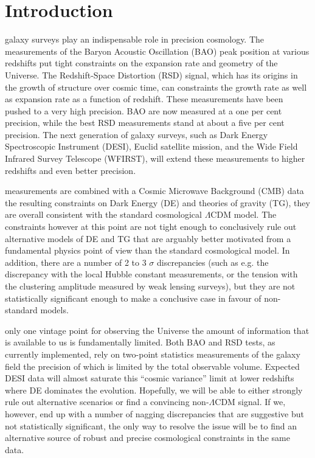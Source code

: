 
\newpage


\section{Introduction} %
galaxy surveys play an indispensable role in precision cosmology.  The
measurements of the Baryon Acoustic Oscillation (BAO) peak position at various
redshifts put tight constraints on the expansion rate and geometry of the
Universe. The Redshift-Space Distortion (RSD) signal, which has its origins in
the growth of structure over cosmic time, can constraints the growth rate as
well as expansion rate as a function of redshift. These measurements have been
pushed to a very high precision. BAO are now measured at a one per cent
precision,  while the best RSD measurements stand at about a five per cent
precision. The next generation of galaxy surveys, such as Dark Energy
Spectroscopic Instrument (DESI), Euclid satellite mission, and the Wide Field
Infrared Survey Telescope (WFIRST), will extend these measurements to higher
redshifts and even better precision.

measurements are combined with a Cosmic Microwave Background (CMB) data the
resulting constraints on Dark Energy (DE) and theories of gravity (TG), they
are overall consistent with the standard cosmological  $\Lambda$CDM model. The
constraints however at this point are not tight enough to conclusively rule
out alternative models of DE and TG that are arguably better motivated from a
fundamental physics point of view than the standard cosmological model. In
addition, there are a number of 2 to 3 $\sigma$ discrepancies (such as e.g.
the discrepancy with the local Hubble constant measurements, or the tension
with the clustering amplitude measured by weak lensing surveys), but they are
not statistically significant enough to make a conclusive case in favour of
non-standard models.
 
only one vintage point for observing the Universe the amount of information
that is  available to us is fundamentally limited. Both BAO and RSD tests, as
currently implemented, rely on two-point statistics measurements of the galaxy
field the precision of which is limited by the total  observable volume.
Expected DESI data will almost saturate this ``cosmic variance'' limit at
lower redshifts where DE dominates the evolution. Hopefully, we will be able
to either strongly rule out alternative scenarios or find a convincing
non-$\Lambda$CDM signal. If we, however, end up with a number of nagging
discrepancies that are suggestive but not statistically significant, the only
way to resolve the issue will be to find an alternative source of robust and
precise cosmological constraints in the same data.

